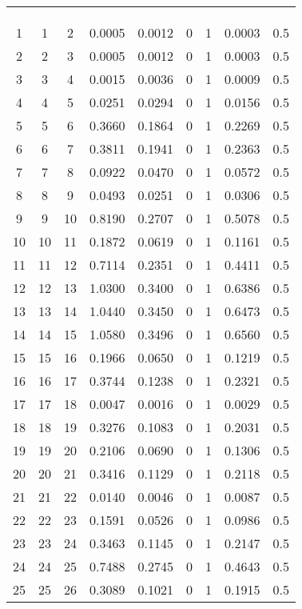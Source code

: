 \begin{longtable}{ccccccccc}
	&  &  &  &  &  &  &  &  \\
	&  &  &  &  &  &  &  &  \\
	&  &  &  &  &  &  &  &  \\
	\cmidrule{1-9} 
	1 & 1 & 2 & 0.0005 & 0.0012 & 0 & 1 & 0.0003 & 0.5 \\
	2 & 2 & 3 & 0.0005 & 0.0012 & 0 & 1 & 0.0003 & 0.5 \\
	3 & 3 & 4 & 0.0015 & 0.0036 & 0 & 1 & 0.0009 & 0.5 \\
	4 & 4 & 5 & 0.0251 & 0.0294 & 0 & 1 & 0.0156 & 0.5 \\
	5 & 5 & 6 & 0.3660 & 0.1864 & 0 & 1 & 0.2269 & 0.5 \\
	6 & 6 & 7 & 0.3811 & 0.1941 & 0 & 1 & 0.2363 & 0.5 \\
	7 & 7 & 8 & 0.0922 & 0.0470 & 0 & 1 & 0.0572 & 0.5 \\
	8 & 8 & 9 & 0.0493 & 0.0251 & 0 & 1 & 0.0306 & 0.5 \\
	9 & 9 & 10 & 0.8190 & 0.2707 & 0 & 1 & 0.5078 & 0.5 \\
	10 & 10 & 11 & 0.1872 & 0.0619 & 0 & 1 & 0.1161 & 0.5 \\
	11 & 11 & 12 & 0.7114 & 0.2351 & 0 & 1 & 0.4411 & 0.5 \\
	12 & 12 & 13 & 1.0300 & 0.3400 & 0 & 1 & 0.6386 & 0.5 \\
	13 & 13 & 14 & 1.0440 & 0.3450 & 0 & 1 & 0.6473 & 0.5 \\
	14 & 14 & 15 & 1.0580 & 0.3496 & 0 & 1 & 0.6560 & 0.5 \\
	15 & 15 & 16 & 0.1966 & 0.0650 & 0 & 1 & 0.1219 & 0.5 \\
	16 & 16 & 17 & 0.3744 & 0.1238 & 0 & 1 & 0.2321 & 0.5 \\
	17 & 17 & 18 & 0.0047 & 0.0016 & 0 & 1 & 0.0029 & 0.5 \\
	18 & 18 & 19 & 0.3276 & 0.1083 & 0 & 1 & 0.2031 & 0.5 \\
	19 & 19 & 20 & 0.2106 & 0.0690 & 0 & 1 & 0.1306 & 0.5 \\
	20 & 20 & 21 & 0.3416 & 0.1129 & 0 & 1 & 0.2118 & 0.5 \\
	21 & 21 & 22 & 0.0140 & 0.0046 & 0 & 1 & 0.0087 & 0.5 \\
	22 & 22 & 23 & 0.1591 & 0.0526 & 0 & 1 & 0.0986 & 0.5 \\
	23 & 23 & 24 & 0.3463 & 0.1145 & 0 & 1 & 0.2147 & 0.5 \\
	24 & 24 & 25 & 0.7488 & 0.2745 & 0 & 1 & 0.4643 & 0.5 \\
	25 & 25 & 26 & 0.3089 & 0.1021 & 0 & 1 & 0.1915 & 0.5 \\

\end{longtable}
